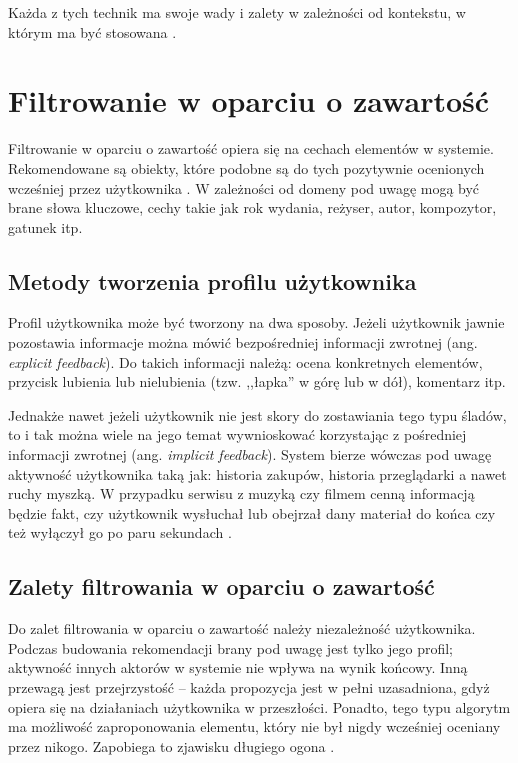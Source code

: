 \documentclass[twoside]{iisthesis}
\begin{document}
	 Każda z tych technik ma swoje wady i zalety w zależności od kontekstu, w którym ma być stosowana \cite{id:IntroductionToRecommenderSystemsHandbook}. 
	 
	 
	 \section{Filtrowanie w oparciu o zawartość}
	 
	 Filtrowanie w oparciu o zawartość opiera się na cechach elementów w systemie. Rekomendowane są obiekty, które podobne są do tych pozytywnie ocenionych wcześniej przez użytkownika \cite{id:huynh2012modeling}. W zależności od domeny pod uwagę mogą być brane słowa kluczowe, cechy takie jak rok wydania, reżyser, autor, kompozytor, gatunek itp.
	 
	 \subsection{Metody tworzenia profilu użytkownika}
	 \label{ss:metody_tworzenia_profilu_uzytkownika}
	 
	 Profil użytkownika może być tworzony na dwa sposoby. Jeżeli użytkownik jawnie pozostawia informacje można mówić bezpośredniej informacji zwrotnej (ang. \textit{explicit feedback}). Do takich informacji należą: ocena konkretnych elementów, przycisk lubienia lub nielubienia (tzw. ,,łapka'' w górę lub w dół), komentarz itp. 
	 
	 Jednakże nawet jeżeli użytkownik nie jest skory do zostawiania tego typu śladów, to i tak można wiele na jego temat wywnioskować korzystając z pośredniej informacji zwrotnej (ang. \textit{implicit feedback}). System bierze wówczas pod uwagę aktywność użytkownika taką jak: historia zakupów, historia przeglądarki a nawet ruchy myszką. W przypadku serwisu z muzyką czy filmem cenną informacją będzie fakt, czy użytkownik wysłuchał lub obejrzał dany materiał do końca czy też wyłączył go po paru sekundach \cite{id:AdvancesInCollaborativeFiltering,id:ContentBasedRecommenderSystemsState}.
	 
	 \subsection{Zalety filtrowania w oparciu o zawartość}
	 
	 Do zalet filtrowania w oparciu o zawartość należy niezależność użytkownika. Podczas budowania rekomendacji brany pod uwagę jest tylko jego profil; aktywność innych aktorów w systemie nie wpływa na wynik końcowy.  Inną przewagą jest przejrzystość -- każda propozycja jest w pełni uzasadniona, gdyż opiera się na działaniach użytkownika w przeszłości. Ponadto, tego typu algorytm ma możliwość zaproponowania elementu, który nie był nigdy wcześniej oceniany przez nikogo. Zapobiega to zjawisku długiego ogona	 \cite{id:ContentBasedRecommenderSystemsState}.
	 
\end{document}

